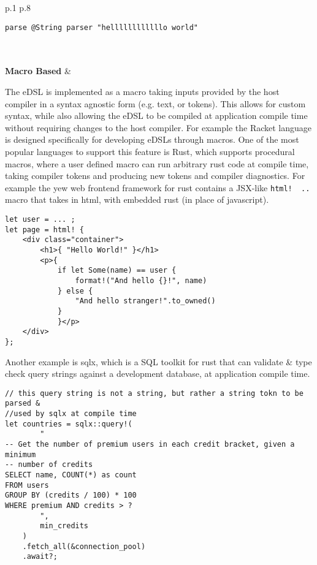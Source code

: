 \begin{center}
\begin{longtable}{p{} p{}}
{\begin{verbatim}
parse @String parser "hellllllllllllo world"
                \end{verbatim}
            }
        \\
        \\
        \textbf{Macro Based}          & {
        The eDSL is implemented as a macro taking inputs provided by the host compiler in a syntax agnostic form (e.g. text, or tokens).
        This allows for custom syntax, while also allowing the eDSL to be compiled at application compile time without requiring changes to the host compiler.
        \newline
        \newline For example the Racket language is designed specifically for developing eDSLs through macros.
        \newline
        \newline One of the most popular languages to support this feature is Rust, which supports procedural macros, where a user defined macro can run
        arbitrary rust code at compile time, taking compiler tokens and producing new tokens and compiler diagnostics.
        \newline
        \newline For example the yew\cite{YewRepo} web frontend framework for rust contains a JSX-like \texttt{html! { .. }} macro that
        takes in html, with embedded rust (in place of javascript).
        \begin{verbatim}
let user = ... ;
let page = html! {
    <div class="container">
        <h1>{ "Hello World!" }</h1>
        <p>{ 
            if let Some(name) == user {
                format!("And hello {}!", name)
            } else {
                "And hello stranger!".to_owned()
            }
            }</p>
    </div>
};
                \end{verbatim}
        Another example is sqlx\cite{sqlxRepo}, which is a SQL toolkit for rust that can validate \& type check query strings against a development database, at application compile time.
        \begin{verbatim}
// this query string is not a string, but rather a string tokn to be parsed & 
//used by sqlx at compile time
let countries = sqlx::query!(
        "
-- Get the number of premium users in each credit bracket, given a minimum
-- number of credits
SELECT name, COUNT(*) as count
FROM users
GROUP BY (credits / 100) * 100
WHERE premium AND credits > ?
        ",
        min_credits
    )
    .fetch_all(&connection_pool)
    .await?;
                \end{verbatim}
        }                                 \\
    \end{longtable}
\end{center}
